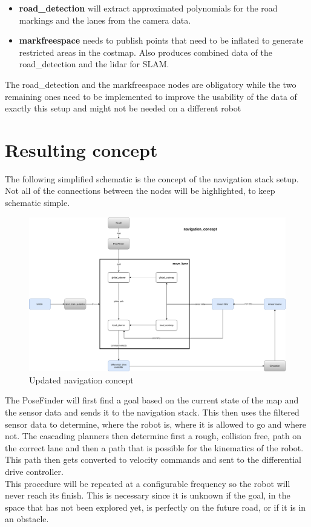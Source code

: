 \begin{itemize}
	\item \textbf{road\_detection} will extract approximated polynomials for the road markings and the lanes from the camera data.
	\item \textbf{markfreespace} needs to publish points that need to be inflated to generate restricted areas in the costmap. Also produces combined data of the road\_detection and the lidar for SLAM.
\end{itemize}

The road\_detection and the markfreespace nodes are obligatory while the two remaining ones need to be implemented to improve the usability of the data of exactly this setup and might not be needed on a different robot

\section{Resulting concept}
The following simplified schematic is the concept of the navigation stack setup. Not all of the connections between the nodes will be highlighted, to keep schematic simple.\\

\begin{figure}[h!]
	\begin{center}
		\includegraphics[width=140mm]{Pictures/Updated navigation concept}
		\caption[Updated navigation concept]{Updated navigation concept}
	\end{center}
\end{figure}



The PoseFinder will first find a goal based on the current state of the map and the sensor data and sends it to the navigation stack. This then uses the filtered sensor data to determine, where the robot is, where it is allowed to go and where not. The cascading planners then determine first a rough, collision free, path on the correct lane and then a path that is possible for the kinematics of the robot. This path then gets converted to velocity commands and sent to the differential drive controller.\\
This procedure will be repeated at a configurable frequency so the robot will never reach its finish. This is necessary since it is unknown if the goal, in the space that has not been explored yet, is perfectly on the future road, or if it is in an obstacle.




